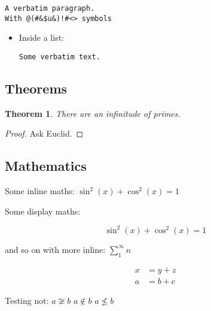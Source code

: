\documentclass[
  text,
  xhtml,
  itex
]{internet}
\newtheorem{theorem}{Theorem}
\begin{document}
\begin{verbatim}
A verbatim paragraph.
With @(#&$u&)!#<> symbols
\end{verbatim}

\begin{itemize}
\item Inside a list:

\begin{verbatim}
Some verbatim text.
\end{verbatim}

\end{itemize}

\subsection{Theorems}

\begin{theorem}
There are an infinitude of primes.
\end{theorem}

\begin{proof}
Ask Euclid.
\end{proof}

\subsection{Mathematics}

Some inline maths: \(\sin^2(x) + \cos^2(x) = 1\)

Some display maths:

\[
  \sin^2(x) + \cos^2(x) = 1
\]

and so on with more inline: \(\sum_1^\infty n\)

\begin{align*}
x &= y + z \\
a &= b + c
\end{align*}

Testing not: \(a \not\cong b\) \(a \not\in b\) \(a \not\le b\)
\end{document}
